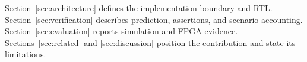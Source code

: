Section~\ref{sec:architecture} defines the implementation boundary and RTL.
Section~\ref{sec:verification} describes prediction, assertions, and scenario
accounting. Section~\ref{sec:evaluation} reports simulation and FPGA evidence.
Sections~\ref{sec:related} and \ref{sec:discussion} position the contribution
and state its limitations.
